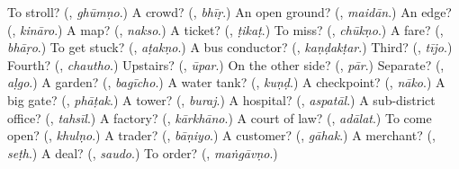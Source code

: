 \begin{tcolorbox}[breakable,colback=teal!4,colframe=teal!35!black,title={Before you move on}]
To stroll? (\textbf{}, \emph{ghūmṇo}.) A crowd? (\textbf{}, \emph{bhīṛ}.) An open ground? (\textbf{}, \emph{maidān}.) An edge? (\textbf{}, \emph{kināro}.) A map? (\textbf{}, \emph{nakso}.) A ticket? (\textbf{}, \emph{ṭikaṭ}.) To miss? (\textbf{}, \emph{chūkṇo}.) A fare? (\textbf{}, \emph{bhāṛo}.) To get stuck? (\textbf{}, \emph{aṭakṇo}.) A bus conductor? (\textbf{}, \emph{kaṇḍakṭar}.) Third? (\textbf{}, \emph{tījo}.) Fourth? (\textbf{}, \emph{chautho}.) Upstairs? (\textbf{}, \emph{ūpar}.) On the other side? (\textbf{}, \emph{pār}.) Separate? (\textbf{}, \emph{aḷgo}.) A garden? (\textbf{}, \emph{bagīcho}.) A water tank? (\textbf{}, \emph{kuṇḍ}.) A checkpoint? (\textbf{}, \emph{nāko}.) A big gate? (\textbf{}, \emph{phāṭak}.) A tower? (\textbf{}, \emph{buraj}.) A hospital? (\textbf{}, \emph{aspatāl}.) A sub-district office? (\textbf{}, \emph{tahsīl}.) A factory? (\textbf{}, \emph{kārkhāno}.) A court of law? (\textbf{}, \emph{adālat}.) To come open? (\textbf{}, \emph{khulṇo}.) A trader? (\textbf{}, \emph{bāṇiyo}.) A customer? (\textbf{}, \emph{gāhak}.) A merchant? (\textbf{}, \emph{seṭh}.) A deal? (\textbf{}, \emph{saudo}.) To order? (\textbf{}, \emph{maṅgāvṇo}.)
\end{tcolorbox}
